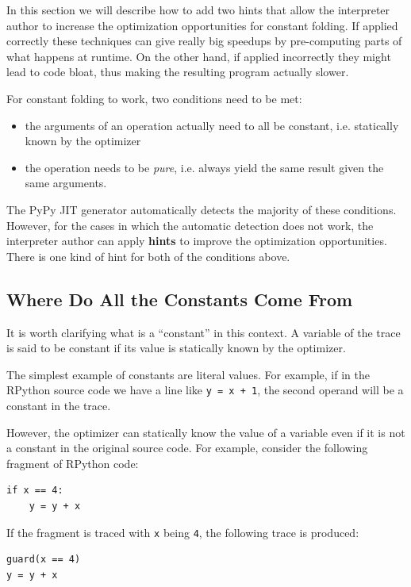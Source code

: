 \documentclass{sigplanconf}
\begin{document}
In this section we will describe how to add two hints that allow the
interpreter author to increase the optimization opportunities for constant
folding. If applied correctly these techniques can give really big speedups by
pre-computing parts of what happens at runtime. On the other
hand, if applied incorrectly they might lead to code bloat, thus making the
resulting program actually slower.

For constant folding to work, two conditions need to be met:

\begin{itemize}
    \item the arguments of an operation actually need to all be constant,
    i.e. statically known by the optimizer
    \item the operation needs to be \emph{pure}, i.e. always yield the same result given
    the same arguments.
\end{itemize}

The PyPy JIT generator automatically detects the majority of these conditions.
However, for the cases in which the automatic detection does not work, the
interpreter author can apply \textbf{hints} to improve the optimization
opportunities. There is one kind of hint for both of the conditions above.


\subsection{Where Do All the Constants Come From}

It is worth clarifying what is a ``constant'' in this context.  A variable of
the trace is said to be constant if its value is statically known by the
optimizer.

The simplest example of constants are literal values.  For example, if in the
RPython source code we have a line like \texttt{y = x + 1}, the second operand will
be a constant in the trace.

However, the optimizer can statically know the value of a variable even if it
is not a constant in the original source code. For example, consider the
following fragment of RPython code:

\begin{lstlisting}[mathescape,basicstyle=\ttfamily]
if x == 4:
    y = y + x
\end{lstlisting}

If the fragment is traced with \texttt{x} being \texttt{4}, the following trace is
produced:
%
\begin{lstlisting}[mathescape,basicstyle=\ttfamily]
guard(x == 4)
y = y + x
\end{lstlisting}
\end{document}
